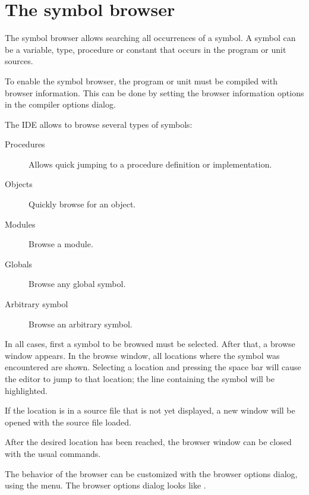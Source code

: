 \section{The symbol browser}
\label{se:browser}
The symbol browser allows searching all occurrences of a symbol. A symbol
can be a variable, type, procedure or constant that occurs in the
program or unit sources.

To enable the symbol browser, the program or unit must be compiled with
browser information. This can be done by setting the browser information
options in the compiler options dialog.

The IDE allows to browse several types of symbols:
\begin{description}
\item[Procedures] Allows quick jumping to a procedure definition or
implementation.
\item[Objects] Quickly browse for an object.
\item[Modules] Browse a module.
\item[Globals] Browse any global symbol.
\item[Arbitrary symbol] Browse an arbitrary symbol.
\end{description}
In all cases, first a symbol to be browsed must be selected. After that,
a browse window appears. In the browse window, all locations where the
symbol was encountered are shown. Selecting a location and pressing the
space bar will cause the editor to jump to that location; the line
containing the symbol will be highlighted.

If the location is in a source file that is not yet displayed, a new
window will be opened with the source file loaded.

After the desired location has been reached, the browser window can be closed
with the usual commands.

The behavior of the browser can be customized with the browser options
dialog, using the  menu.
The browser options dialog looks like .


